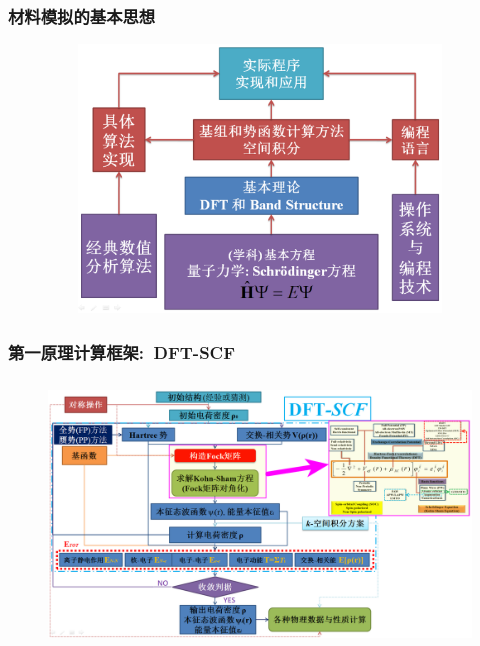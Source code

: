 \documentclass[cjk,slidestop,compress,mathserif,blue]{beamer}
\begin{document}
\frame
{
	\frametitle{材料模拟的基本思想}
\begin{figure}[h!]
\vspace*{-0.25in}
\centering
\includegraphics[height=2.80in,width=4.95in,viewport=5 3 1250 780,clip]{Figures/Method_Procedure.png}
\label{Method-Procedure}
\end{figure}
}

\frame
{
	\frametitle{第一原理计算框架:~\textrm{DFT-SCF}}
\begin{figure}[h!]
\centering
\vspace*{-0.25in}
\hspace*{-0.80in}
\includegraphics[height=2.80in,width=4.95in,viewport=5 3 1490 870,clip]{Figures/DFT-SCF_2.png}
\label{Pseudo-NC}
\end{figure}
}
\end{document}
